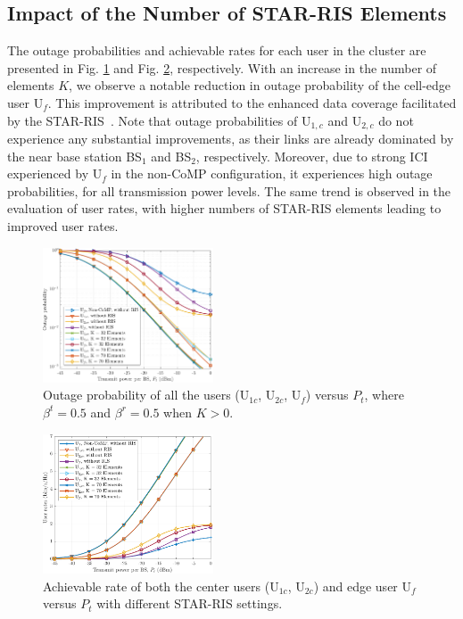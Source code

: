\documentclass[conference]{IEEEtran}
\begin{document}
\subsection{Impact of the Number of STAR-RIS Elements}
The outage probabilities and achievable rates for each user in the cluster are presented in Fig. \ref{fig:outage} and Fig. \ref{fig:rates}, respectively. With an increase in the number of elements $K$, we observe a notable reduction in outage probability of the cell-edge user U$_f$. This improvement is attributed to the enhanced data coverage facilitated by the STAR-RIS~\cite{wang2022outage}. Note that outage probabilities of U$_{1,c}$ and U$_{2,c}$ do not experience any substantial improvements, as their links are already dominated by the near base station BS$_1$ and BS$_2$, respectively. Moreover, due to strong ICI experienced by U$_f$ in the non-CoMP configuration, it experiences high outage probabilities, for all transmission power levels. The same trend is observed in the evaluation of user rates, with higher numbers of STAR-RIS elements leading to improved user rates.
\begin{figure}[t]
    \centering
    \includegraphics[width=0.45\textwidth]{figs/outage.pdf}
    \caption{Outage probability of all the users ($\text{U}_{1c}$, $\text{U}_{2c}$, $\text{U}_f$) versus $P_{t}$, where $\beta^t=0.5$ and $\beta^r=0.5$ when $K > 0$.}
    \label{fig:outage}
\end{figure}
\begin{figure}[t]
    \centering
    \includegraphics[width=0.45\textwidth]{figs/rates.pdf}
    \caption{Achievable rate of both the center users ($\text{U}_{1c}$, $\text{U}_{2c}$) and edge user $\text{U}_f$ versus $P_{t}$ with different STAR-RIS settings.}
    \label{fig:rates}
\end{figure}
\end{document}
